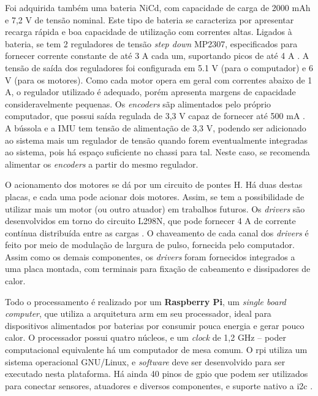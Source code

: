Foi adquirida também uma bateria NiCd, com capacidade de carga de 2000 mAh e 7,2 V de tensão nominal. Este tipo de bateria se caracteriza por apresentar recarga rápida e boa capacidade de utilização com correntes altas. Ligados à bateria, se tem 2 reguladores de tensão \textit{step down} MP2307, especificados para fornecer corrente constante de até 3 A cada um, suportando picos de até 4 A \citep{MP2307}. A tensão de saída dos reguladores foi configurada em 5.1 V (para o computador) e 6 V (para os motores). Como cada motor opera em geral com correntes abaixo de 1 A, o regulador utilizado é adequado, porém apresenta margens de capacidade consideravelmente pequenas. Os \textit{encoders} sãp alimentados pelo próprio computador, que possui saída regulada de 3,3 V capaz de fornecer até 500 mA \citep{upton2014raspberry}. A bússola e a IMU tem tensão de alimentação de 3,3 V, podendo ser adicionado ao sistema mais um regulador de tensão quando forem eventualmente integradas ao sistema, pois há espaço suficiente no chassi para tal. Neste caso, se recomenda alimentar os \textit{encoders} a partir do mesmo regulador.

O acionamento dos motores se dá por um circuito de pontes H. Há duas destas placas, e cada uma pode acionar dois motores. Assim, se tem a possibilidade de utilizar mais um motor (ou outro atuador) em trabalhos futuros. Os \textit{drivers} são desenvolvidos em torno do circuito L298N, que pode fornecer 4 A de corrente contínua distribuída entre as cargas \citep{L298N}. O chaveamento de cada canal dos \textit{drivers} é feito por meio de modulação de largura de pulso, fornecida pelo computador. Assim como os demais componentes, os \textit{drivers} foram fornecidos integrados a uma placa montada, com terminais para fixação de cabeamento e dissipadores de calor.

Todo o processamento é realizado por um \textbf{Raspberry Pi}, um \emph{single board computer}, que utiliza a arquitetura \acrshort{arm} em seu processador, ideal para dispositivos alimentados por baterias por consumir pouca energia e gerar pouco calor. O processador possui quatro núcleos, e um \emph{clock} de 1,2 GHz -- poder computacional equivalente há um computador de mesa comum. O \acrshort{rpi} utiliza um sistema operacional GNU/Linux, e \emph{software} deve ser desenvolvido para ser executado nesta plataforma. Há ainda 40 pinos de \acrshort{gpio} que podem ser utilizados para conectar sensores, atuadores e diversos componentes, e suporte nativo a \acrshort{i2c} \citep{upton2014raspberry}.


